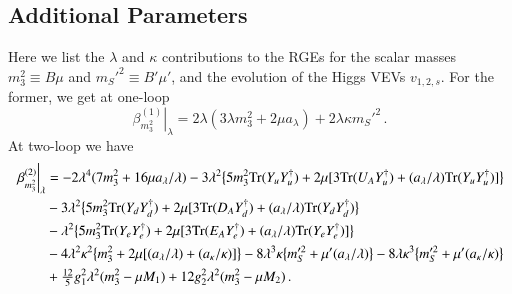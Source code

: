 \documentclass[final,3p,times]{elsarticle}
\newcommand{\lamsq}{\lambda^2}
\newcommand{\kapsq}{\kappa^2}
\newcommand{\tr}{\mathrm{Tr}}
\newcommand{\mtrisq}{m_3^2}
\newcommand{\msprsq}{m_S'^2}
\begin{document}
\subsection{Additional Parameters}
Here we list the $\lambda$ and $\kappa$ contributions to the RGEs for the scalar masses $\mtrisq \equiv B\mu$ and $\msprsq \equiv B'\mu'$, and the evolution of the Higgs VEVs $v_{1,2,s}$.  For the former, we get at one-loop
%
\begin{equation}
\left.\beta_{\mtrisq}^{(1)}\right|_\lambda = 2\lambda(3\lambda\mtrisq + 2\mu a_\lambda) + 2\lambda\kappa\msprsq\,.
\end{equation}
%
At two-loop we have
%
\begin{align}
\left.\beta_{\mtrisq}^{(2)}\right|_\lambda &= -2\lambda^4(7\mtrisq + 16\mu a_\lambda/\lambda) -3\lamsq\big\{ 5\mtrisq\tr( Y_u Y_u^\dagger) 
+ 2\mu[3\tr( U_A Y_u^\dagger) + (a_\lambda/\lambda)\tr( Y_u Y_u^\dagger)] \big\} \notag \\
%
&-3\lamsq\big\{ 5\mtrisq\tr( Y_d Y_d^\dagger) + 2\mu[3\tr( D_A Y_d^\dagger) 
+ (a_\lambda/\lambda)\tr( Y_d Y_d^\dagger) \big\} \notag \\
%
&-\lamsq\big\{5\mtrisq\tr( Y_e Y_e^\dagger) 
+ 2\mu[3\tr( E_A Y_e^\dagger) + (a_\lambda/\lambda)\tr( Y_e Y_e^\dagger)] \big\} \notag \\
%
&-4\lamsq\kapsq\big\{ \mtrisq + 2\mu[(a_\lambda/\lambda) + (a_\kappa/\kappa)] \big\} 
-8\lambda^3\kappa\big\{ m_S'^2 + \mu'(a_\lambda/\lambda)\big\} - 8\lambda\kappa^3\big\{m_S'^2 + \mu'(a_\kappa/\kappa)\big\} \notag \\
%
&+\tfrac{12}{5}g_1^2\lamsq(\mtrisq - \mu M_1) + 12g_2^2\lamsq(\mtrisq -\mu M_2) \,.
\end{align}
\end{document}
